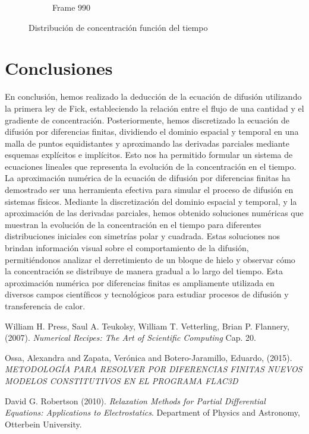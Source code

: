 \documentclass{article}
\begin{document}
\begin{figure} [H]
\begin{subfigure}{0.3\linewidth}
    \caption{Frame 990}
  \end{subfigure}
  \caption{Distribución de concentración función del tiempo}
  \label{fig:cubica3d}
\end{figure}

\section{Conclusiones}
En conclusión, hemos realizado la deducción de la ecuación de difusión utilizando la primera ley de Fick, estableciendo la relación entre el flujo de una cantidad y el gradiente de concentración. Posteriormente, hemos discretizado la ecuación de difusión por diferencias finitas, dividiendo el dominio espacial y temporal en una malla de puntos equidistantes y aproximando las derivadas parciales mediante esquemas explícitos e implícitos. Esto nos ha permitido formular un sistema de ecuaciones lineales que representa la evolución de la concentración en el tiempo.\\

La aproximación numérica de la ecuación de difusión por diferencias finitas ha demostrado ser una herramienta efectiva para simular el proceso de difusión en sistemas físicos. Mediante la discretización del dominio espacial y temporal, y la aproximación de las derivadas parciales, hemos obtenido soluciones numéricas que muestran la evolución de la concentración en el tiempo para diferentes distribuciones iniciales con simetrías polar y cuadrada. Estas soluciones nos brindan información visual sobre el comportamiento de la difusión, permitiéndonos analizar el derretimiento de un bloque de hielo y observar cómo la concentración se distribuye de manera gradual a lo largo del tiempo. Esta aproximación numérica por diferencias finitas es ampliamente utilizada en diversos campos científicos y tecnológicos para estudiar procesos de difusión y transferencia de calor.



\begin{thebibliography}{X}

     William H. Press, Saul A. Teukolsy, William T. Vetterling, Brian P. Flannery, (2007). \textit{Numerical Recipes: The Art of Scientific Computing} Cap. 20.

    Ossa, Alexandra and Zapata, Verónica and Botero-Jaramillo, Eduardo, (2015). \textit{METODOLOGÍA PARA RESOLVER POR DIFERENCIAS FINITAS NUEVOS MODELOS CONSTITUTIVOS EN EL PROGRAMA FLAC3D}

     David G. Robertson (2010). \textit{Relaxation Methods for Partial Differential Equations: Applications to Electrostatics}. Department of Physics and Astronomy, Otterbein University.
    
 \end{thebibliography}
\end{document}
